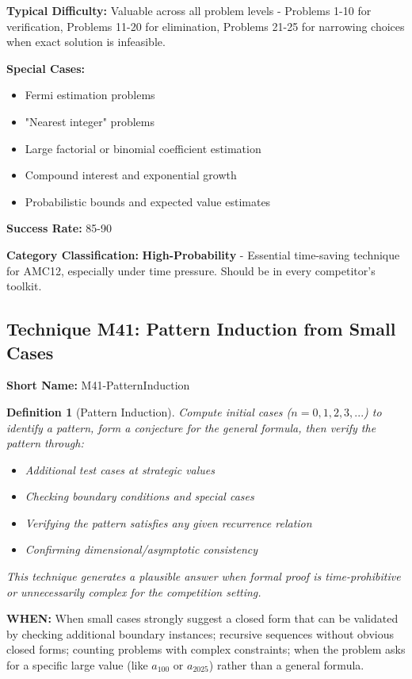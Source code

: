 \documentclass[12pt]{article}
\newtheorem{definition}{Definition}[section]
\begin{document}
\textbf{Typical Difficulty:} Valuable across all problem levels - Problems 1-10 for verification, Problems 11-20 for elimination, Problems 21-25 for narrowing choices when exact solution is infeasible.

\textbf{Special Cases:} 
\begin{itemize}
    \item Fermi estimation problems
    \item "Nearest integer" problems  
    \item Large factorial or binomial coefficient estimation
    \item Compound interest and exponential growth
    \item Probabilistic bounds and expected value estimates
\end{itemize}

\textbf{Success Rate:} 85-90%

\textbf{Category Classification:} \textbf{High-Probability} - Essential time-saving technique for AMC12, especially under time pressure. Should be in every competitor's toolkit.

\subsection{Technique M41: Pattern Induction from Small Cases}
\textbf{Short Name:} M41-PatternInduction

\begin{definition}[Pattern Induction]
Compute initial cases ($n=0,1,2,3,...$) to identify a pattern, form a conjecture for the general formula, then verify the pattern through:
\begin{itemize}
    \item Additional test cases at strategic values
    \item Checking boundary conditions and special cases
    \item Verifying the pattern satisfies any given recurrence relation
    \item Confirming dimensional/asymptotic consistency
\end{itemize}
This technique generates a plausible answer when formal proof is time-prohibitive or unnecessarily complex for the competition setting.
\end{definition}

\textbf{WHEN:} When small cases strongly suggest a closed form that can be validated by checking additional boundary instances; recursive sequences without obvious closed forms; counting problems with complex constraints; when the problem asks for a specific large value (like $a_{100}$ or $a_{2025}$) rather than a general formula.
\end{document}
